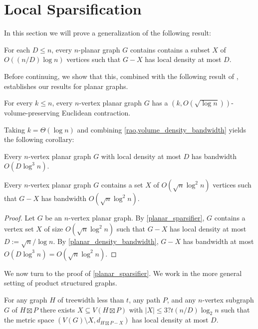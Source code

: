 \documentclass{patmorin}
\begin{document}
\section{Local Sparsification}

In this section we will prove a generalization of the following result:

\begin{lem}\label{planar_sparsifier}
  For each $D\le n$, every $n$-planar graph $G$ contains contains a subset $X$ of $O((n/D)\log n)$ vertices such that $G-X$ has local density at most $D$.
\end{lem}

Before continuing, we show that this, combined with the following result of \citet{rao:small}, establishes our results for planar graphs.

\begin{thm}\label{rao}
  For every $k\le n$, every $n$-vertex planar graph $G$ has a $(k,O(\sqrt{\log n}))$-volume-preserving Euclidean contraction.
\end{thm}

Taking $k=\Theta(\log n)$ and combining \cref{rao,volume_density_bandwidth} yields the following corollary:

\begin{cor}\label{planar_density_bandwidth}
  Every $n$-vertex planar graph $G$ with local density at most $D$ has bandwidth $O(D\log^{3} n)$.
\end{cor}

\begin{thm}\label{fan_partition_planar}
  Every $n$-vertex planar graph $G$ contains a set $X$ of $O(\sqrt{n}\log^2 n)$ vertices such that $G-X$ has bandwidth $O(\sqrt{n}\log^2 n)$.
\end{thm}

\begin{proof}
  Let $G$ be an $n$-vertex planar graph.  By \cref{planar_sparsifier}, $G$ contains a vertex set $X$ of size $O(\sqrt{n}\log^2 n)$ such that $G-X$ has local density at most $D:=\sqrt{n}/\log n$.  By \cref{planar_density_bandwidth}, $G-X$ has bandwidth at most $O(D\log^{3} n)=O(\sqrt{n}\log^2 n)$.
\end{proof}

We now turn to the proof of \cref{planar_sparsifier}.  We work in the more general setting of product structured graphs.


\begin{lem}\label{sparsifier_simple}
  For any graph $H$ of treewidth less than $t$, any path $P$, and any $n$-vertex subgraph $G$ of $H\boxtimes P$ there exists $X\subseteq V(H\boxtimes P)$ with $|X|\le 3?t(n/D)\log_2 n$ such that the metric space $(V(G)\setminus X, d_{H\boxtimes P-X})$ has local density at most $D$.
\end{lem}
\end{document}
